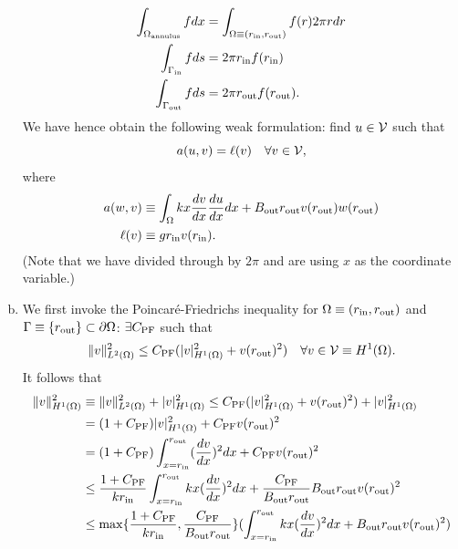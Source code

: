 \documentclass[preprint,11pt]{article}
\begin{document}
\begin{enumerate}[(a)]
  \begin{align*}
    \int_{\Omega_{\rm annulus}} f dx
    &= \int_{\Omega \equiv (r_{\rm in},r_{\rm out})} f(r) 2\pi r dr \\
    \int_{\Gamma_{\rm in}} f ds
    &= 2\pi r_{\rm in} f(r_{\rm in}) \\
    \int_{\Gamma_{\rm out}} f ds
    &= 2\pi r_{\rm out} f(r_{\rm out}).
  \end{align*}
  We have hence obtain the following weak formulation: find $u \in \mathcal{V}$ such that
  \begin{equation*}
    a(u,v) = \ell(v) \quad \forall v \in \mathcal{V},
  \end{equation*}
  where
  \begin{align*}
    a(w,v) &\equiv \int_{\Omega} k x \frac{d v}{d x} \frac{d u}{d x} dx + B_{\rm out} r_{\rm out} v(r_{\rm out})w(r_{\rm out}) \\
    \ell(v) &\equiv  g r_{\rm in} v(r_{\rm in})   .
  \end{align*}
  (Note that we have divided through by $2\pi$ and are using $x$ as the coordinate variable.)
\item We first invoke the Poincar\'e-Friedrichs inequality for $\Omega \equiv (r_{\rm in}, r_{\rm out})$ and $\Gamma \equiv \{ r_{\rm out} \} \subset \partial \Omega$:  $\exists C_{\rm PF}$ such that 
  \begin{align*}
    \| v \|_{L^2(\Omega)}^2 \leq C_{\rm PF} (|v|^2_{H^1(\Omega)} + v(r_{\rm out})^2) \quad \forall v \in \mathcal{V} \equiv H^1(\Omega). 
  \end{align*}
  It follows that
  \begin{align*}
    \| v \|_{H^1(\Omega)}^2
    &\equiv
    \| v \|_{L^2(\Omega)}^2  + | v |_{H^1(\Omega)}^2
    \leq
    C_{\rm PF} (|v|^2_{H^1(\Omega)} + v(r_{\rm out})^2) + | v |_{H^1(\Omega)}^2
    \\
    &= (1 + C_{\rm PF}) | v |^2_{H^1(\Omega)} +  C_{\rm PF} v(r_{\rm out})^2
    \\
    &= (1 + C_{\rm PF}) \int_{x = r_{\rm in}}^{r_{\rm out}} (\dd{v}{x})^2 dx +  C_{\rm PF} v(r_{\rm out})^2
    \\
    &\leq
    \frac{1 + C_{\rm PF}}{k r_{\rm in}} \int_{x = r_{\rm in}}^{r_{\rm out}} kx (\dd{v}{x})^2 dx +  \frac{ C_{\rm PF}}{B_{\rm out} r_{\rm out}}B_{\rm out} r_{\rm out} v(r_{\rm out})^2
    \\
    &\leq
    \max\{   \frac{1 + C_{\rm PF}}{k r_{\rm in}}, \frac{C_{\rm PF} }{B_{\rm out} r_{\rm out}} \} ( \int_{x = r_{\rm in}}^{r_{\rm out}} kx (\dd{v}{x})^2 dx + B_{\rm out} r_{\rm out} v(r_{\rm out})^2) \\

\end{align*}
\end{enumerate}
\end{document}
